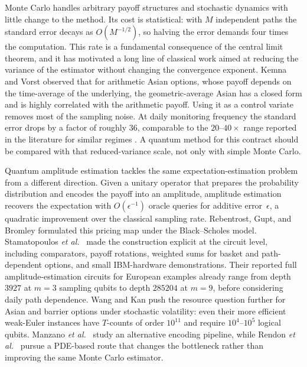 \documentclass[12pt]{article}
\begin{document}
Monte Carlo handles arbitrary payoff structures and stochastic dynamics with little change to the method.  Its cost is statistical: with $M$ independent paths the standard error decays as $O(M^{-1/2})$, so halving the error demands four times the computation.  This rate is a fundamental consequence of the central limit theorem, and it has motivated a long line of classical work aimed at reducing the variance of the estimator without changing the convergence exponent.  Kemna and Vorst \cite{kemnaPricingMethodOptions1990} observed that for arithmetic Asian options, whose payoff depends on the time-average of the underlying, the geometric-average Asian has a closed form and is highly correlated with the arithmetic payoff.  Using it as a control variate removes most of the sampling noise.  At daily monitoring frequency the standard error drops by a factor of roughly $36$, comparable to the $20\text{--}40\times$ range reported in the literature for similar regimes \cite{kemnaPricingMethodOptions1990,glassermanMonteCarloMethods2004}.  A quantum method for this contract should be compared with that reduced-variance scale, not only with simple Monte Carlo.

Quantum amplitude estimation \cite{brassardQuantumAmplitudeAmplification2002} tackles the same expectation-estimation problem from a different direction.  Given a unitary operator that prepares the probability distribution and encodes the payoff into an amplitude, amplitude estimation recovers the expectation with $O(\epsilon^{-1})$ oracle queries for additive error~$\epsilon$, a quadratic improvement over the classical sampling rate.  Rebentrost, Gupt, and Bromley \cite{rebentrostQuantumComputationalFinance2018} formulated this pricing map under the Black--Scholes model.  Stamatopoulos \textit{et al.}\ \cite{stamatopoulosOptionPricingUsing2020} made the construction explicit at the circuit level, including comparators, payoff rotations, weighted sums for basket and path-dependent options, and small IBM-hardware demonstrations.  Their reported full amplitude-estimation circuits for European examples already range from depth $3927$ at $m=3$ sampling qubits to depth $285204$ at $m=9$, before considering daily path dependence.  Wang and Kan \cite{wangOptionPricingStochastic2024} push the resource question further for Asian and barrier options under stochastic volatility: even their more efficient weak-Euler instances have $T$-counts of order $10^{11}$ and require $10^4$--$10^5$ logical qubits.  Manzano \textit{et al.}\ \cite{manzanoAlternativePipelineOption2025} study an alternative encoding pipeline, while Rendon \textit{et al.}\ \cite{rendonExponentialImprovementAsian2025} pursue a PDE-based route that changes the bottleneck rather than improving the same Monte Carlo estimator.
\end{document}
